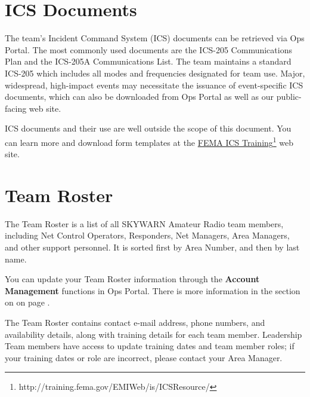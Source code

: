 \documentclass[pdflatex,letterpaper,twoside,12pt]{book}
\begin{document}
\section{ICS Documents}

The team's Incident Command System (ICS) documents can be retrieved via Ops Portal.  The most commonly used documents are the ICS-205 Communications Plan and the ICS-205A Communications List.  The team maintains a standard ICS-205 which includes all modes and frequencies designated for team use.  Major, widespread, high-impact events may necessitate the issuance of event-specific ICS documents, which can also be downloaded from Ops Portal as well as our public-facing web site.

ICS documents and their use are well outside the scope of this document.  You can learn more and download form templates at the \href{http://training.fema.gov/EMIWeb/is/ICSResource/}{FEMA ICS Training}\footnote{http://training.fema.gov/EMIWeb/is/ICSResource/} web site.


\section{Team Roster}\label{team-roster}

The Team Roster is a list of all SKYWARN Amateur Radio team members, including Net Control Operators, Responders, Net Managers, Area Managers, and other support personnel.  It is sorted first by Area Number, and then by last name.

You can update your Team Roster information through the \textbf{Account Management} functions in Ops Portal.  There is more information in the section on  on page \pageref{profile-update}.

The Team Roster contains contact e-mail address, phone numbers, and availability details, along with training details for each team member.  Leadership Team members have access to update training dates and team member roles;  if your training dates or role are incorrect, please contact your Area Manager.

\end{document}

